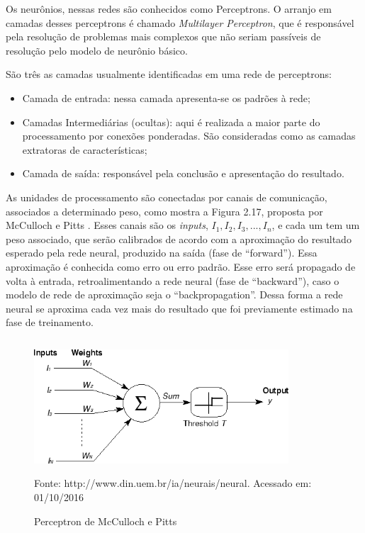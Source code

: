 Os neurônios, nessas redes são conhecidos como Perceptrons. O arranjo em camadas desses perceptrons é chamado \textit{Multilayer Perceptron}, que é responsável pela resolução de problemas mais complexos que não seriam passíveis de resolução pelo modelo 
de neurônio básico. 

São três as camadas usualmente identificadas em uma rede de perceptrons:
\begin{itemize}
 \item Camada de entrada: nessa camada apresenta-se os padrões à rede;
 \item Camadas Intermediárias (ocultas): aqui é realizada a maior parte do processamento por conexões ponderadas. São consideradas como as camadas 
 extratoras de características;
 \item Camada de saída: responsável pela conclusão e apresentação do resultado.
\end{itemize}

As unidades de processamento são conectadas por canais de comunicação, associados a determinado peso, como mostra a Figura 2.17, proposta por McCulloch e Pitts \cite{mcculloch1943logical}.
Esses canais são os  \textit{inputs}, $ I_{1}, I_{2}, I_{3},...,I_{n}$, e cada um tem um peso associado, que serão calibrados de acordo 
com a aproximação do resultado esperado pela rede neural, produzido na saída (fase de ``forward''). Essa aproximação é conhecida como erro ou erro padrão.  Esse erro será propagado de volta à entrada, retroalimentando a rede neural (fase de ``backward''), caso o modelo de rede de aproximação seja o ``backpropagation''. Dessa forma a rede neural se aproxima cada vez mais do resultado que foi previamente estimado na fase de treinamento.

\begin{figure}[htbp!]
\centering
\caption{Perceptron de McCulloch e Pitts}
\vspace{1mm}
\includegraphics[width=95mm, height=50mm]{Figuras/Neural/Perceptron.png}\\
\tiny Fonte: http://www.din.uem.br/ia/neurais/neural. Acessado em: 01/10/2016
\end{figure}


